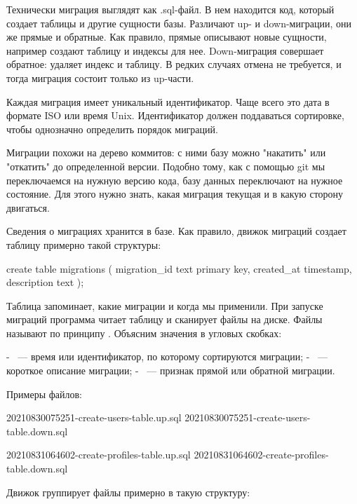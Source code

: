 Технически миграция выглядят как .sql-файл. В нем находится код, который создает таблицы и другие сущности базы. Различают up- и down-миграции, они же прямые и обратные. Как правило, прямые описывают новые сущности, например создают таблицу и индексы для нее. Down-миграция совершает обратное: удаляет индекс и таблицу. В редких случаях отмена не требуется, и тогда миграция состоит только из up-части.

Каждая миграция имеет уникальный идентификатор. Чаще всего это дата в формате ISO или время Unix. Идентификатор должен поддаваться сортировке, чтобы однозначно определить порядок миграций.

Миграции похожи на дерево коммитов: с ними базу можно "накатить" или "откатить" до определенной версии. Подобно тому, как с помощью git мы переключаемся на нужную версию кода, базу данных переключают на нужное состояние. Для этого нужно знать, какая миграция текущая и в какую сторону двигаться.

Сведения о миграциях хранится в базе. Как правило, движок миграций создает таблицу  примерно такой структуры:

\begin{english}
  \begin{sql}
create table migrations (
  migration_id text primary key,
  created_at timestamp,
  description text
);
  \end{sql}
\end{english}

Таблица запоминает, какие миграции и когда мы применили. При запуске миграций программа читает таблицу и сканирует файлы на диске. Файлы называют по принципу . Объясним значения в угловых скобках:

- ~--- время или идентификатор, по которому сортируются миграции;
- ~--- короткое описание миграции;
- ~--- признак прямой или обратной миграции.

Примеры файлов:

\begin{english}
  \begin{text}
20210830075251-create-users-table.up.sql
20210830075251-create-users-table.down.sql

20210831064602-create-profiles-table.up.sql
20210831064602-create-profiles-table.down.sql
  \end{text}
\end{english}

Движок группирует файлы примерно в такую структуру:

